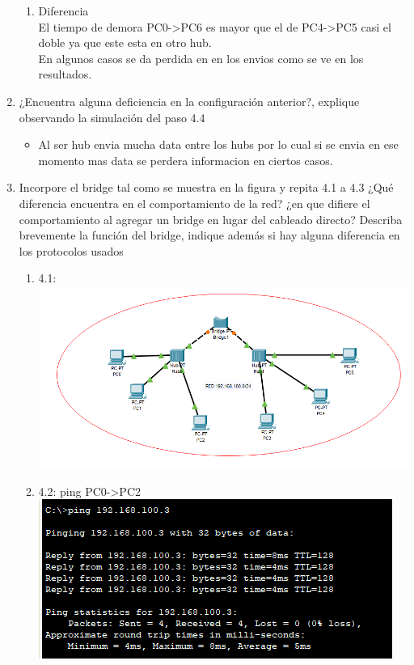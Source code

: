 \documentclass[11pt]{article}
\begin{document}
\begin{enumerate}
\begin{enumerate}
        \item Diferencia\\
        El tiempo de demora PC0->PC6 es mayor que el de PC4->PC5 casi el doble ya que este esta en otro hub.\\
        En algunos casos se da perdida en en los envios como se ve en los resultados.
    \end{enumerate}
    \item ¿Encuentra alguna deficiencia en la configuración anterior?, explique observando la simulación del paso 4.4
    \begin{itemize}
        \item Al ser hub envia mucha data entre los hubs por lo cual si se envia en ese momento mas data se perdera informacion en ciertos casos.
    \end{itemize}
    \item Incorpore el bridge tal como se muestra en la figura y repita 4.1 a 4.3 ¿Qué diferencia encuentra en el comportamiento de la red? ¿en que difiere el comportamiento al agregar un bridge en lugar del cableado directo? Describa brevemente la función del bridge, indique además si hay alguna diferencia en los protocolos usados
    \begin{enumerate}
        \item 4.1:\\
        \includegraphics[scale=0.5]{Act/6.PNG}
        \item 4.2: ping PC0->PC2\\
        \includegraphics[scale=0.5]{Act/6_1.PNG}

\end{enumerate}
\end{enumerate}
\end{document}

